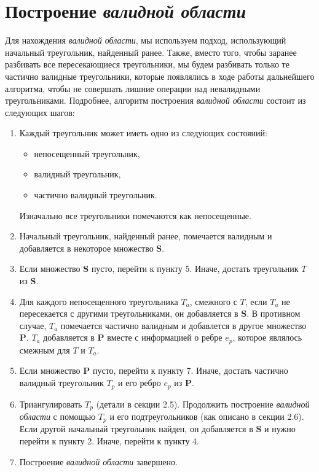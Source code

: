 \section{Построение \textit{валидной области}}

Для нахождения \textit{валидной области}, мы используем подход, использующий начальный треугольник, найденный ранее.
Также, вместо того, чтобы заранее разбивать все пересекающиеся треугольники, мы будем разбивать только те частично валидные треугольники, которые появлялись в ходе работы дальнейшего алгоритма, чтобы не совершать лишние операции над невалидными треугольниками. Подробнее, алгоритм построения \textit{валидной области} состоит из следующих шагов:

\begin{enumerate}
\item
Каждый треугольник может иметь одно из следующих состояний:
\begin{itemize}
\item непосещенный треугольник,
\item валидный треугольник,
\item частично валидный треугольник.
\end{itemize}
Изначально все треугольники помечаются как непосещенные.

\item
Начальный треугольник, найденный ранее, помечается валидным и добавляется в некоторое множество $\mathbf{S}$.

\item
Если множество $\mathbf{S}$ пусто, перейти к пункту 5. Иначе, достать треугольник $T$ из $\mathbf{S}$.

\item
Для каждого непосещенного треугольника $T_a$, смежного с $T$, если $T_a$ не пересекается с другими треугольниками, он добавляется в $\mathbf{S}$. В противном случае, $T_a$ помечается частично валидным и добавлется в другое множество $\mathbf{P}$. $T_a$ добавляется в $\mathbf{P}$ вместе с информацией о ребре $e_p$, которое являлось смежным для $T$ и $T_a$.

\item
Если множество $\mathbf{P}$ пусто, перейти к пункту 7. Иначе, достать частично валидный треугольник $T_p$ и его ребро $e_p$ из $\mathbf{P}$.

\item
Триангулировать $T_p$ (детали в секции 2.5). Продолжить построение \textit{валидной области} с помощью $T_p$ и его подтреугольников (как описано в секции 2.6). Если другой начальный треугольник найден, он добавляется в $\mathbf{S}$ и нужно перейти к пункту 2. Иначе, перейти к пункту 4.

\item Построение \textit{валидной области} завершено.

\end{enumerate}

